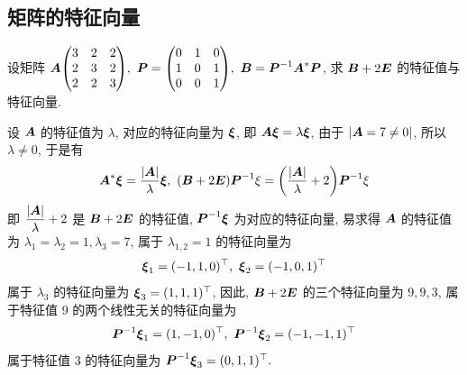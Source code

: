 \subsection{矩阵的特征向量}

\begin{example}
    设矩阵 $\vb*{A}\mqty(3&2&2\\2&3&2\\2&2&3),~\vb*{P}=\mqty(0&1&0\\1&0&1\\0&0&1),~\vb*{B}=\vb*{P}^{-1}\vb*{A}^*\vb*{P}$, 求 $\vb*{B}+2\vb*{E}$ 的特征值与特征向量.
\end{example}
\begin{solution}
    设 $\vb*{A}$ 的特征值为 $\lambda$, 对应的特征向量为 $\vb*{\xi}$, 即 $\vb*{A\xi}=\lambda\vb*{\xi}$, 由于 $|\vb*{A}=7\neq0|$, 所以 $\lambda\neq0$, 于是有 
    $$\vb*{A}^*\vb*{\xi}=\dfrac{|\vb*{A}|}{\lambda}\vb*{\xi},~(\vb*{B}+2\vb*{E})\vb*{P}^{-1}\xi=\qty(\dfrac{|\vb*{A}|}{\lambda}+2)\vb*{P}^{-1}\xi$$
    即 $\dfrac{|\vb*{A}|}{\lambda}+2$ 是 $\vb*{B}+2\vb*{E}$ 的特征值, $\vb*{P}^{-1}\vb*{\xi}$ 为对应的特征向量, 
    易求得 $\vb*{A}$ 的特征值为 $\lambda_1=\lambda_2=1,\lambda_3=7$, 属于 $\lambda_{1,2}=1$ 的特征向量为 
    $$\vb*{\xi}_1=(-1,1,0)^\top,~\vb*{\xi}_2=(-1,0,1)^\top$$
    属于 $\lambda_3$ 的特征向量为 $\vb*{\xi}_3=(1,1,1)^\top$, 因此, $\vb*{B}+2\vb*{E}$ 的三个特征向量为 $9,9,3$, 属于特征值 9 的两个线性无关的特征向量为 
    $$\vb*{P}^{-1}\vb*{\xi}_1=(1,-1,0)^\top,~\vb*{P}^{-1}\vb*{\xi}_2=(-1,-1,1)^\top$$
    属于特征值 3 的特征向量为 $\vb*{P}^{-1}\vb*{\xi}_3=(0,1,1)^\top.$
\end{solution}

